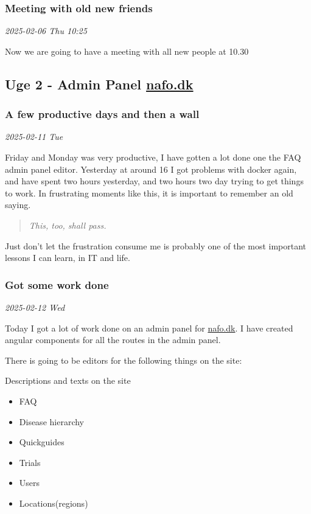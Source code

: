 \documentclass[../main.tex]{subfiles}
\begin{document}
\subsubsection{Meeting with old new friends}

\textit{2025-02-06 Thu 10:25}

Now we are going to have a meeting with all new people at 10.30 

\subsection{Uge 2 - Admin Panel \href{https://www.nationaltforsoegsoverblik.dk/}{nafo.dk}}
\subsubsection{\textbf{A few productive days and then a wall}}

\textit{2025-02-11 Tue}

Friday and Monday was very productive, I have gotten a lot done one the FAQ admin panel editor. Yesterday at around 16 I got problems with docker again, and have spent two hours yesterday, and two hours two day trying to get things to work. In frustrating moments like this, it is important to remember an old saying.

\begin{quote}
\emph{This, too, shall pass.}
\end{quote}

Just don't let the frustration consume me is probably one of the most important lessons I can learn, in IT and life.

\subsubsection{\textbf{Got some work done}}

\textit{2025-02-12 Wed}

Today I got a lot of work done on an admin panel for \href{https://www.nationaltforsoegsoverblik.dk/}{nafo.dk}. I have created angular components for all the routes in the admin panel.

There is going to be editors for the following things on the site:

Descriptions and texts on the site

\begin{itemize}
\item
  FAQ
\item
  Disease hierarchy
\item
  Quickguides
\item
  Trials
\item
  Users
\item
  Locations(regions)
\end{itemize}
\end{document}
